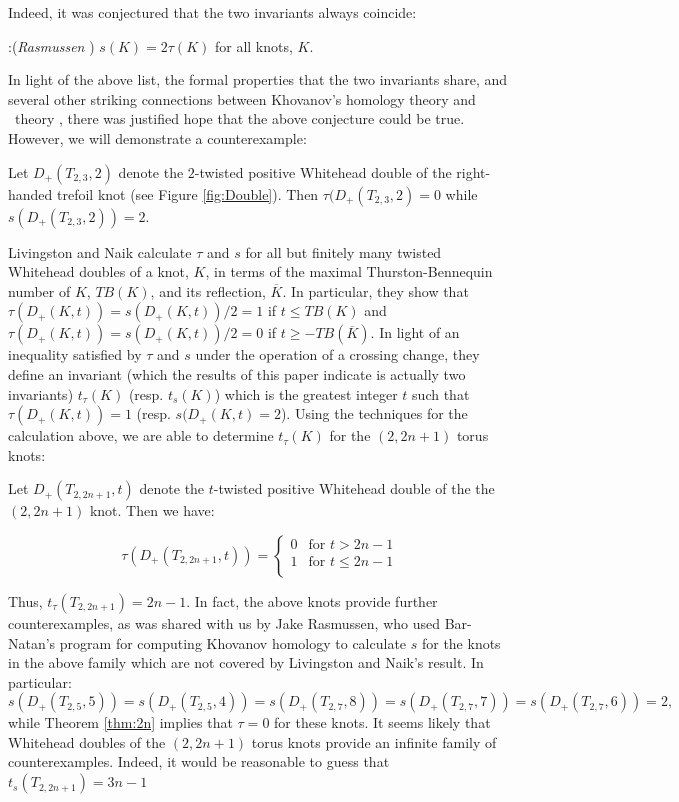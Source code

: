 \bigskip
\noindent Indeed, it was conjectured that the two invariants always coincide:

\bigskip
{}:({\em Rasmussen} \cite{Ras2}) $s(K)=2\tau(K)$ for all knots, $K$.  
\bigskip

In light of the above list, the formal properties that the two invariants share, and several other striking connections between Khovanov's homology theory and  \os \ theory \cite{Seidel,Branched,Ciprian,Ras4}, there was justified hope that the above conjecture could be true.  However, we will demonstrate a counterexample:

\begin{theorem}
	Let $D_+(T_{2,3},2)$ denote the $2$-twisted positive Whitehead double of the right-handed trefoil knot (see Figure \ref{fig:Double}).  Then $\tau(D_+(T_{2,3},2)=0$ while $s(D_+(T_{2,3},2))=2$.  
\end{theorem}

Livingston and Naik \cite{Livingston2} calculate $\tau$ and $s$ for all but finitely many twisted Whitehead doubles of a knot, $K$, in terms of the maximal Thurston-Bennequin number of $K$, $TB(K)$, and its reflection, $\overline{K}$. In particular, they show that  $\tau(D_+(K,t))=s(D_+(K,t))/2=1$ if $t \le TB(K)$ and  $\tau(D_+(K,t))=s(D_+(K,t))/2=0$ if $t \ge -TB(\overline{K})$.  In light of an inequality satisfied by $\tau$ and $s$ under the operation of a crossing change, they define an invariant (which the results of this paper indicate is actually two invariants) $t_{\tau}(K)$ (resp. $t_s(K)$) which is the greatest integer $t$ such that $\tau(D_+(K,t))=1$ (resp. $s(D_+(K,t)=2$).  Using the techniques for the calculation above, we are able to determine $t_{\tau}(K)$ for the $(2,2n+1)$ torus knots:

\begin{theorem}
\label{thm:2n}
Let $D_+(T_{2,2n+1},t)$  denote the $t$-twisted positive Whitehead double of the the $(2,2n+1)$ knot.  Then we have:

$$ \tau(D_+(T_{2,2n+1},t))= 
\left\{\begin{array}{ll}

0  & {\text{for
 $t>2n-1$}} \\

 1 & {\text{for
 $t\le2n-1$}} \\

\end{array}
\right. $$
\end{theorem}

Thus, $t_{\tau}(T_{2,2n+1})=2n-1$.  In fact, the above knots provide further counterexamples, as was shared with us by Jake Rasmussen, who used Bar-Natan's  program \cite{BarNatan} for computing Khovanov homology to calculate $s$ for the knots in the above family which are not covered by Livingston and Naik's result.  In particular:
$$ s(D_+(T_{2,5},5))= s(D_+(T_{2,5},4))= s(D_+(T_{2,7},8))= s(D_+(T_{2,7},7))= s(D_+(T_{2,7},6))=2, $$
\noindent while Theorem \ref{thm:2n} implies that $\tau=0$ for these knots.  It seems likely that Whitehead doubles of the $(2,2n+1)$ torus knots provide an infinite family of counterexamples.  Indeed, it would be reasonable to guess that $t_s(T_{2,2n+1})=3n-1$




